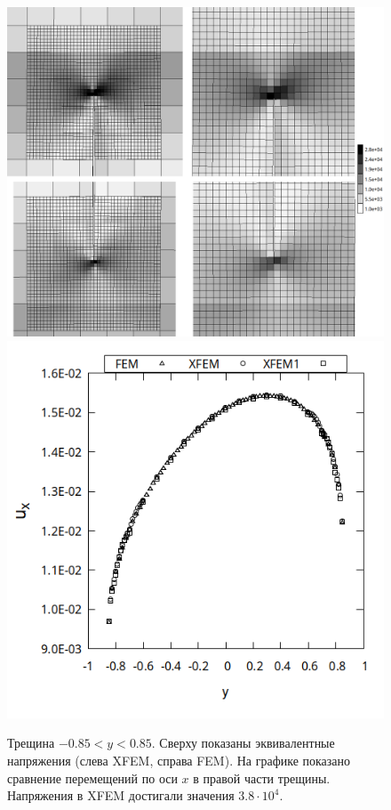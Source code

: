 \begin{figure}[h!]
	\includegraphics[height=0.4\textheight]{pictures/0.85_top_bot}
	\includegraphics[height=0.4\textheight]{pictures/0.85_ux}
	\caption{ Трещина $-0.85<y<0.85$. Сверху показаны эквивалентные напряжения (слева XFEM, справа FEM). На графике показано сравнение перемещений по оси $x$ в правой части трещины. Напряжения в XFEM достигали значения $3.8\cdot 10^{4}$.
	}
	\label{fig:res1}
\end{figure}
